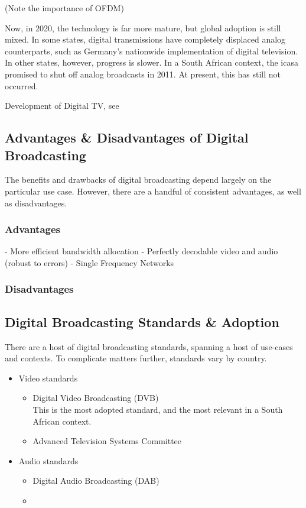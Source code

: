 \documentclass[class=report,11pt,crop=false]{standalone}
\begin{document}
(Note the importance of OFDM)

Now, in 2020, the technology is far more mature, but global adoption is still mixed. In some states, digital transmissions have completely displaced analog counterparts, such as Germany's nationwide implementation of digital television. In other states, however, progress is slower. In a South African context, the \gls{icasa} promised to shut off analog broadcasts in 2011. At present, this has still not occurred.

Development of Digital TV, see~\cite{Wu2006}

\subsection{Advantages \& Disadvantages of Digital Broadcasting}
The benefits and drawbacks of digital broadcasting depend largely on the particular use case. However, there are a handful of consistent advantages, as well as disadvantages.

\subsubsection{Advantages}
- More efficient bandwidth allocation
- Perfectly decodable video and audio (robust to errors)
- Single Frequency Networks

\subsubsection{Disadvantages}

\subsection{Digital Broadcasting Standards \& Adoption}
There are a host of digital broadcasting standards, spanning a host of use-cases and contexts. To complicate matters further, standards vary by country.

\begin{itemize}
    \item Video standards
        \begin{itemize}
            \item Digital Video Broadcasting (DVB) \\
            This is the most adopted standard, and the most relevant in a South African context.
            \item Advanced Television Systems Committee
        \end{itemize}
    \item Audio standards
        \begin{itemize}
            \item Digital Audio Broadcasting (DAB) \\
            \item 
        \end{itemize}
\end{itemize}
\end{document}
